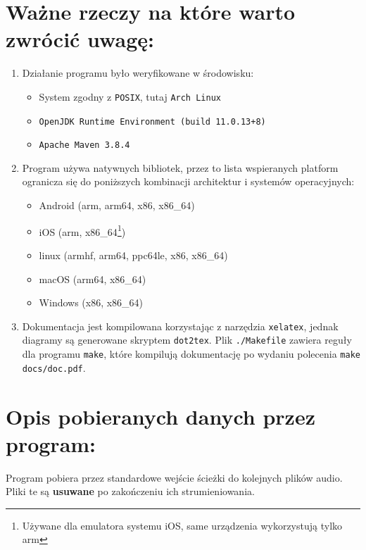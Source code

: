 \documentclass[a4paper,12pt]{article}
\begin{document}
\section*{Ważne rzeczy na które warto zwrócić uwagę:}

\begin{enumerate}
    \item Działanie programu było weryfikowane w środowisku: 
        \begin{itemize}
            \item System zgodny z \texttt{POSIX}, tutaj \texttt{Arch Linux}
            \item \texttt{OpenJDK Runtime Environment (build 11.0.13+8)}
            \item \texttt{Apache Maven 3.8.4}
        \end{itemize}
    \item Program używa natywnych bibliotek, przez to lista wspieranych platform
        ogranicza się do poniższych kombinacji architektur i systemów
        operacyjnych: 
        \begin{itemize}
            \item Android (arm, arm64, x86, x86\_64)
            \item iOS (arm, x86\_64\footnote{Używane dla emulatora systemu iOS,
                same urządzenia wykorzystują tylko arm})
            \item linux (armhf, arm64, ppc64le, x86, x86\_64)
            \item macOS (arm64, x86\_64)
            \item Windows (x86, x86\_64)
        \end{itemize}
    \item Dokumentacja jest kompilowana korzystając z narzędzia
        \texttt{xelatex}, jednak diagramy są generowane skryptem
        \texttt{dot2tex}. Plik \texttt{./Makefile} zawiera reguły dla programu
        \texttt{make}, które kompilują dokumentację po wydaniu polecenia
        \texttt{make docs/doc.pdf}.
\end{enumerate}

\section{Opis pobieranych danych przez program:}

Program pobiera przez standardowe wejście ścieżki do kolejnych plików audio.
Pliki te są \textbf{usuwane} po zakończeniu ich strumieniowania.
\end{document}
